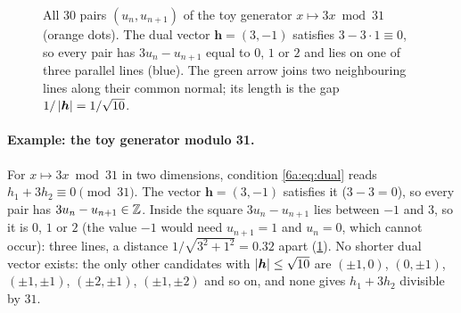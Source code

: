 \begin{figure}[htbp]
\centering
{}
\caption{All 30 pairs $(u_n,u_{n+1})$ of the toy generator $x\mapsto3x\bmod31$
(orange dots). The dual vector $\bm h=(3,-1)$ satisfies $3-3\cdot1\equiv0$, so
every pair has $3u_n-u_{n+1}$ equal to $0$, $1$ or $2$ and lies on one of three
parallel lines (blue). The green arrow joins two neighbouring lines along their
common normal; its length is the gap $1/\left\lvert \bm h\right\rvert=1/\sqrt{10}$.}
\label{6a:fig:dual-lattice}
\end{figure}

\paragraph{Example: the toy generator modulo 31.}
For $x\mapsto3x\bmod31$ in two dimensions, condition \eqref{6a:eq:dual} reads
$h_1+3h_2\equiv0\pmod{31}$. The vector $\bm h=(3,-1)$ satisfies it
($3-3=0$), so every pair has $3u_n-u_{n+1}\in\Z$. Inside the square
$3u_n-u_{n+1}$ lies between $-1$ and $3$, so it is $0$, $1$ or $2$ (the value $-1$
would need $u_{n+1}=1$ and $u_n=0$, which cannot occur): three lines, a distance
$1/\sqrt{3^2+1^2}=0.32$ apart (\cref{6a:fig:dual-lattice}). No shorter dual vector
exists: the only other candidates with $\left\lvert \bm h\right\rvert\le\sqrt{10}$ are
$(\pm1,0)$, $(0,\pm1)$, $(\pm1,\pm1)$, $(\pm2,\pm1)$, $(\pm1,\pm2)$ and so on, and
none gives $h_1+3h_2$ divisible by $31$.

